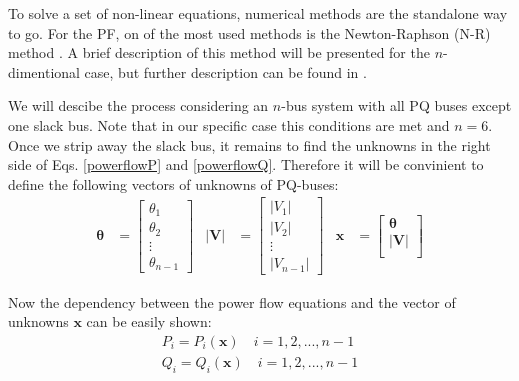 \documentclass[a4paper,11pt, titlepage, twoside]{article}
\begin{document}
To solve a set of non-linear equations, numerical methods are the standalone way to go. For the PF, on of the most used methods is the Newton-Raphson (N-R) method \cite{NRusual}. A brief description of this method will be presented for the $n$-dimentional case, but further description can be found in \cite{llibrebase}.

We will descibe the process considering an $n$-bus system with all PQ buses except one slack bus. Note that in our specific case this conditions are met and $n = 6$. Once we strip away the slack bus, it remains to find the unknowns in the right side of Eqs. \ref{powerflowP} and \ref{powerflowQ}. Therefore it will be convinient to
define the following vectors of unknowns of PQ-buses:
\begin{equation}
\begin{aligned}
    \mathbf{\theta} &= \begin{bmatrix}
    \theta_1 \\
    \theta_2 \\
    \vdots \\
    \theta_{n-1}
    \end{bmatrix} &
    \mathbf{|V|} &= \begin{bmatrix}
    |V_1| \\
    |V_2| \\
    \vdots \\
    |V_{n-1}|
    \end{bmatrix} &
    \mathbf{x} &= \begin{bmatrix}
    \mathbf{\theta} \\
    \mathbf{|V|} \\
    \end{bmatrix}
\end{aligned}
\end{equation}

Now the dependency between the power flow equations and the vector of unknowns $\mathbf{x}$ can be easily shown:
\begin{subequations}
\begin{align}
    P_i = P_i(\mathbf{x}) \quad i = 1,2,...,n-1 \\
    Q_i = Q_i(\mathbf{x}) \quad i = 1,2,...,n-1
\end{align}       
\end{subequations}
\end{document}
